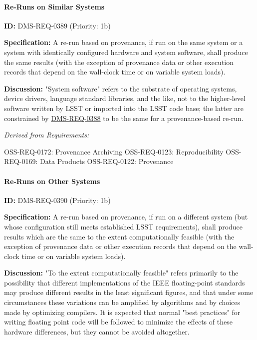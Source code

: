 \documentclass[SE,toc,lsstdraft]{lsstdoc}
\begin{document}
\paragraph{Re-Runs on Similar Systems}\hfill  %

\label{DMS-REQ-0389}
\textbf{ID:} DMS-REQ-0389 (Priority: 1b)

\textbf{Specification:}
A re-run based on provenance, if run on the same system or a system with identically configured hardware and system software, shall produce the same results (with the exception of provenance data or other execution records that depend on the wall-clock time or on variable system loads).

\textbf{Discussion:}
"System software" refers to the substrate of operating systems, device drivers, language standard libraries, and the like, not to the higher-level software written by LSST or imported into the LSST code base; the latter are constrained by \hyperref[DMS-REQ-0388]{DMS-REQ-0388} to be the same for a provenance-based re-run.

\emph{Derived from Requirements:}

OSS-REQ-0172:
Provenance Archiving \newline
OSS-REQ-0123:
Reproducibility \newline
OSS-REQ-0169:
Data Products \newline
OSS-REQ-0122:
Provenance \newline

\paragraph{Re-Runs on Other Systems}\hfill  %

\label{DMS-REQ-0390}
\textbf{ID:} DMS-REQ-0390 (Priority: 1b)

\textbf{Specification:}
A re-run based on provenance, if run on a different system (but whose configuration still meets established LSST requirements), shall produce results which are the same to the extent computationally feasible (with the exception of provenance data or other execution records that depend on the wall-clock time or on variable system loads).

\textbf{Discussion:}
"To the extent computationally feasible" refers primarily to the possibility that different implementations of the IEEE floating-point standards may produce different results in the least significant figures, and that under some circumstances these variations can be amplified by algorithms and by choices made by optimizing compilers.  It is expected that normal "best practices" for writing floating point code will be followed to minimize the effects of these hardware differences, but they cannot be avoided altogether.
\end{document}
